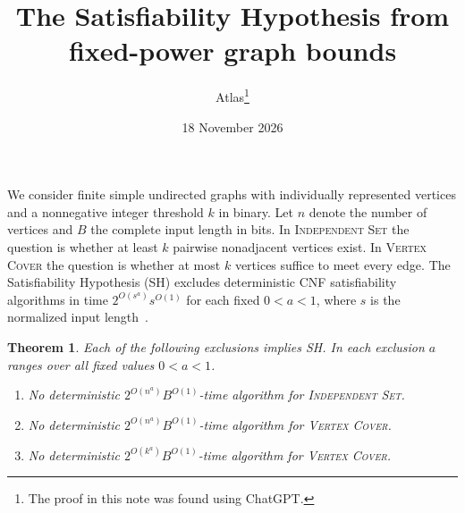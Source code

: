 \documentclass[11pt]{article}
\title{The Satisfiability Hypothesis from fixed-power graph bounds}
\author{Atlas\thanks{The proof in this note was found using ChatGPT.}}
\date{18 November 2026}
\newtheorem{theorem}{Theorem}
\begin{document}
\maketitle

We consider finite simple undirected graphs with individually represented
vertices and a nonnegative integer threshold \(k\) in binary. Let \(n\)
denote the number of vertices and \(B\) the complete input length in bits.
In \textsc{Independent Set} the question is whether at least \(k\)
pairwise nonadjacent vertices exist. In \textsc{Vertex Cover} the question
is whether at most \(k\) vertices suffice to meet every edge.
The Satisfiability Hypothesis (SH) excludes deterministic CNF satisfiability
algorithms in time \(2^{O(s^a)}s^{O(1)}\) for each fixed \(0<a<1\), where
\(s\) is the normalized input length~\cite{sh}.

\hypertarget{is-order-sh-converse}{}
\hypertarget{vc-order-sh-converse}{}
\hypertarget{vc-budget-sh-converse}{}
\begin{theorem}\label{thm:classical-sh}
Each of the following exclusions implies SH. In each exclusion \(a\)
ranges over all fixed values \(0<a<1\).
\begin{enumerate}
\item No deterministic \(2^{O(n^a)}B^{O(1)}\)-time algorithm for
\textsc{Independent Set}.
\item No deterministic \(2^{O(n^a)}B^{O(1)}\)-time algorithm for
\textsc{Vertex Cover}.
\item No deterministic \(2^{O(k^a)}B^{O(1)}\)-time algorithm for
\textsc{Vertex Cover}.
\end{enumerate}
\end{theorem}
\end{document}
